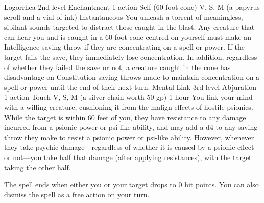\DndSpellHeader%
    {Logorrhea\label{spl:logorrhea}}
    {2nd-level Enchantment}
    {1 action}
    {Self (60-foot cone)}
    {V, S, M (a papyrus scroll and a vial of ink)}
    {Instantaneous}
You unleash a torrent of meaningless, sibilant sounds targeted
to distract those caught in the blast.
Any creature that can hear you and is
caught in a 60-foot cone centred on yourself must
make an Intelligence saving throw if they are concentrating on
a spell or power. If the target fails the save,
they immediately lose concentration. In addition,
regardless of whether they failed the save or not, a creature
caught in the cone has disadvantage on
Constitution saving throws made to maintain concentration on
a spell or power until the end of their next turn. %
%
\DndSpellHeader%
    {Mental Link\label{spl:mental_link}}
    {3rd-level Abjuration}
    {1 action}
    {Touch}
    {V, S, M (a silver chain worth 50 gp)}
    {1 hour}
You link your mind with a willing creature, cushioning it from
the malign effects of hostile psionics.
While the target is within 60 feet of you, they have resistance
to any damage incurred from a psionic power
or psi-like ability, and may add a d4 to any saving throw
they make to resist a psionic power or psi-like ability.
However, whenever they take psychic damage---regardless
of whether it is caused by a psionic effect
or not---you take half that damage (after applying resistances),
with the target taking the other half.

The spell ends when either you or your target drops to 0 hit points.
You can also dismiss the spell as a free action on your turn.%
%
